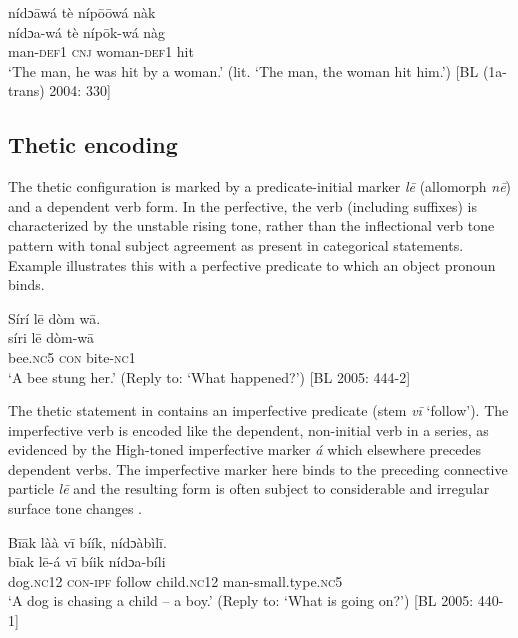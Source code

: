 \documentclass[output=paper]{langsci/langscibook}
\begin{document}
\ea
\gll \textup{}  nídɔ\={a}wá  tè  níp\={o}\={o}wá  nàk\\
  \textup{  nídɔa-wá  tè  níp\={o}k-wá  nàg}\\
\glt man-\textsc{def}1  \textsc{cnj}  woman-\textsc{def}1  hit\\
‘The man, he was hit by a woman.’ (lit. ‘The man, the woman hit him.’) [BL (1a-trans) 2004: 330] 
\z

\subsection{Thetic encoding}\label{sec:schwarz:3.3}

The thetic configuration is marked by a predicate-initial marker \textit{l\={e}} (allomorph \textit{n\={e}}) and a dependent verb form. In the perfective, the verb (including suffixes) is characterized by the unstable rising tone, rather than the inflectional verb tone pattern with tonal subject agreement as present in categorical statements. Example  illustrates this with a perfective predicate to which an object pronoun binds.

\ea
\glll \textup{}  Sírí    l\={e}  dòm  w\={a}.\\
  \textup{  síri    l\={e}  dòm-w\={a}}\\
       bee.\textsc{nc}5  \textsc{con}  bite-\textsc{nc}1\\
\glt ‘A bee stung her.’ (Reply to: ‘What happened?’) [BL  2005: 444-2]
\z

The thetic statement in  contains an imperfective predicate (stem \textit{v\={i}} ‘follow’). The imperfective verb is encoded like the dependent, non-initial verb in a series, as evidenced by the High-toned imperfective marker \textit{á} which elsewhere precedes dependent verbs. The imperfective marker here binds to the preceding connective particle \textit{l\={e}} and the resulting form is often subject to considerable and irregular surface tone changes \citep{Schwarz2007}.

\ea
\glll \textup{}  B\={i}\={a}k    làà    v\={i}  bíík,    nídɔàbìl\={i}.\\
  \textup{  b\={i}ak    l\={e}-á    v\={i}  bíik    nídɔa-bíli}\\
       dog.\textsc{nc}12  \textsc{con}-\textsc{ipf}  follow  child.\textsc{nc}12  man-small.type.\textsc{nc}5\\
\glt ‘A dog is chasing a child – a boy.’ (Reply to: ‘What is going on?’) [BL  2005: 440-1]
\z
\end{document}
